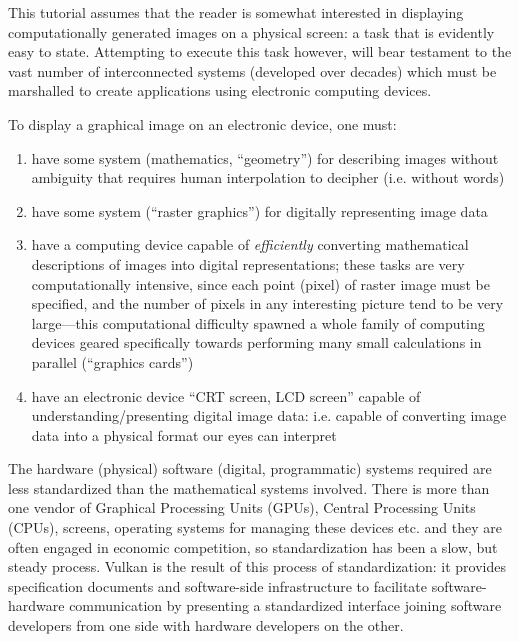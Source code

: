 \documentclass[12pt,letterpaper]{article}
\newcommand{\inquotes}[1]{``#1''}	%
\begin{document}
This tutorial assumes that the reader is somewhat interested in displaying computationally generated images on a physical screen: a task that is evidently easy to state. Attempting to execute this task however, will bear testament to the vast number of interconnected systems (developed over decades) which must be marshalled to create applications using electronic computing devices. 

To display a graphical image on an electronic device, one must:
    \begin{enumerate}
        \item have some system (mathematics, \inquotes{geometry}) for describing images without ambiguity that requires human interpolation to decipher (i.e. without words)
        
        \item have some system (\inquotes{raster graphics}) for digitally representing image data
        
        \item have a computing device capable of \emph{efficiently} converting mathematical descriptions of images into digital representations; these tasks are very computationally intensive, since each point (pixel) of raster image must be specified, and the number of pixels in any interesting picture tend to be very large---this computational difficulty spawned a whole family of computing devices geared specifically towards performing many small calculations in parallel (\inquotes{graphics cards})
        
        \item have an electronic device \inquotes{CRT screen, LCD screen} capable of understanding/presenting digital image data: i.e. capable of converting image data into a physical format our eyes can interpret
    \end{enumerate}

The hardware (physical) software (digital, programmatic) systems required are less standardized than the mathematical systems involved. There is more than one vendor of Graphical Processing Units (GPUs), Central Processing Units (CPUs), screens, operating systems for managing these devices etc. and they are often engaged in economic competition, so standardization has been a slow, but steady process. Vulkan is the result of this process of standardization: it provides specification documents and software-side infrastructure to facilitate software-hardware communication by presenting a standardized interface joining software developers from one side with hardware developers on the other. 
\end{document}
